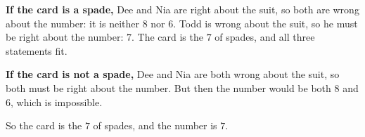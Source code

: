 \textbf{If the card is a spade,} Dee and Nia are right about the suit, so both are wrong about the number: it is neither $8$ nor $6$. Todd is wrong about the suit, so he must be right about the number: $7$. The card is the $7$ of spades, and all three statements fit.

\textbf{If the card is not a spade,} Dee and Nia are both wrong about the suit, so both must be right about the number. But then the number would be both $8$ and $6$, which is impossible.

So the card is the $7$ of spades, and the number is $\boxed{7}$.
